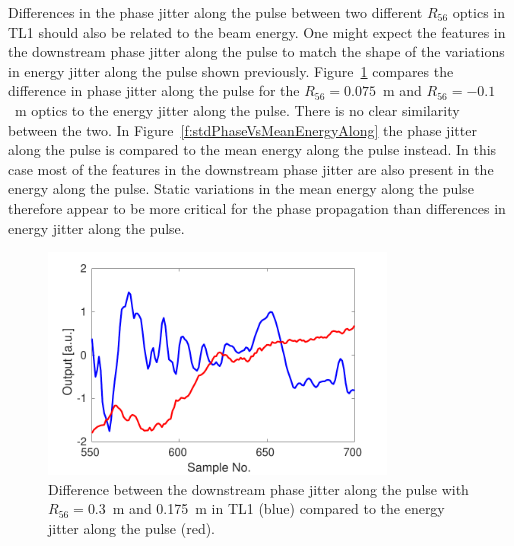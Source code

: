 Differences in the phase jitter along the pulse between two different \(R_{56}\) optics in TL1 should also be related to the beam energy. One might expect the features in the downstream phase jitter along the pulse to match the shape of the variations in energy jitter along the pulse shown previously. Figure~\ref{f:stdPhaseVsStdEnergyAlong} compares the difference in phase jitter along the pulse for the \(R_{56} = 0.075\)~m and \(R_{56} = -0.1\)~m optics to the energy jitter along the pulse. There is no clear similarity between the two. In Figure~\ref{f:stdPhaseVsMeanEnergyAlong} the phase jitter along the pulse is compared to the mean energy along the pulse instead. In this case most of the features in the downstream phase jitter are also present in the energy along the pulse. Static variations in the mean energy along the pulse therefore appear to be more critical for the phase propagation than differences in energy jitter along the pulse. %

\begin{figure}
  \centering
  \includegraphics[width=0.8\textwidth]{Figures/propagation/stdPhaseVsStdEnergyAlong}
  \caption{Difference between the downstream phase jitter along the pulse with \(R_{56} = 0.3\)~m and 0.175~m in TL1 (blue) compared to the energy jitter along the pulse (red).}
  \label{f:stdPhaseVsStdEnergyAlong}
\end{figure}

